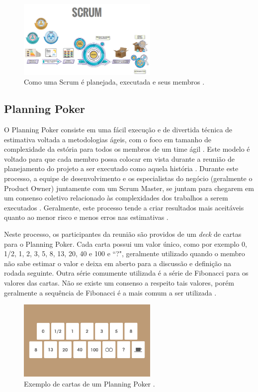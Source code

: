\begin{figure}[h!]
    \centering
    \includegraphics[width=0.6\textwidth]{img/Imagem Scrum Primer.png}
    \caption{Como uma Scrum é planejada, executada e seus membros \cite{primer}.}
    \label{fig:scrum}
\end{figure}

\subsection{Planning Poker}

O Planning Poker consiste em uma fácil execução e de divertida técnica de estimativa voltada a metodologias ágeis, com o foco em tamanho de complexidade da estória para todos os membros de um time ágil \cite{planningpoker,usingfunctionpoints,storyestimation}. Este modelo é voltado para que cada membro possa colocar em vista durante a reunião de planejamento do projeto a ser executado como aquela história \cite{Scrum}. Durante este processo, a equipe de desenvolvimento e os especialistas do negócio (geralmente o Product Owner) juntamente com um Scrum Master, se juntam para chegarem em um consenso coletivo relacionado às complexidades dos trabalhos a serem executados \cite{techplanningpoker}. Geralmente, este processo tende a criar resultados mais aceitáveis quanto ao menor risco e menos erros nas estimativas \cite{usingplanningpoker2}.

Neste processo, os participantes da reunião são providos de um \textit{deck} de cartas para o Planning Poker. Cada carta possui um valor único, como por exemplo 0, 1/2, 1, 2, 3, 5, 8, 13, 20, 40 e 100 e ``?", geralmente utilizado quando o membro não sabe estimar o valor e deixa em aberto para a discussão e definição na rodada seguinte. Outra série comumente utilizada é a série de Fibonacci para os valores das cartas. Não se existe um consenso a respeito tais valores, porém geralmente a sequência de Fibonacci é a mais comum a ser utilizada \cite{evaluatingplanningpoker}.

\begin{figure}[h!]
    \centering
    \includegraphics[width=0.6\textwidth]{img/planningpoker.png}
    \caption{Exemplo de cartas de um Planning Poker \cite{visual}.}
    \label{fig:planningpoker}
\end{figure}


